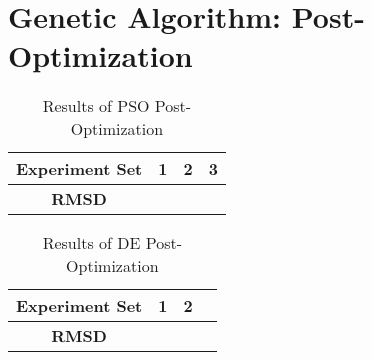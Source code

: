 \section{Genetic Algorithm: Post-Optimization}

\begin{table}
	\label{table:post-op-pso-results}
	\centering
	\begin{tabular}{ | >{\bfseries}c | c | c | c | }
		\hline
		Experiment Set & 1 & 2 & 3 \\ \hline
		RMSD &  &  &  \\ \hline
	\end{tabular}
	\caption{Results of PSO Post-Optimization}
\end{table}

\begin{table}
	\label{table:post-op-de-results}
	\centering
	\begin{tabular}{ | >{\bfseries}c | c | c | c | }
		\hline
		Experiment Set & 1 & 2 \\ \hline
		RMSD &  &  \\ \hline
	\end{tabular}
	\caption{Results of DE Post-Optimization}
\end{table}